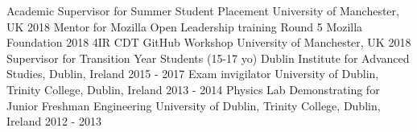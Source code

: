 \vspace{-8pt}
\begin{cvpress}
   \cvpres
   {Academic Supervisor for Summer Student Placement}
    {University of Manchester, UK}
    {2018}
   \cvpres
   {Mentor for Mozilla Open Leadership training Round 5}
    {Mozilla Foundation}
    {2018}
   \cvpres
   {4IR CDT GitHub Workshop}
    {University of Manchester, UK}
    {2018}
   \cvpres
   {Supervisor for Transition Year Students (15-17 yo)}
   {Dublin Institute for Advanced Studies, Dublin, Ireland}
   {2015 - 2017}
   \cvpres
   {Exam invigilator}
   {University of Dublin, Trinity College, Dublin, Ireland}
   {2013 - 2014}
   \cvpres
   {Physics Lab Demonstrating for Junior Freshman Engineering}
   {University of Dublin, Trinity College, Dublin, Ireland}
   {2012 - 2013}
\end{cvpress}


